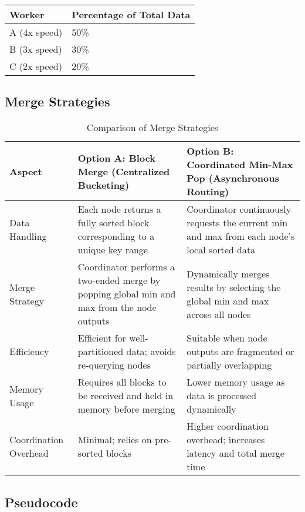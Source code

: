 \documentclass[]{interact}
\theoremstyle{plain}
\theoremstyle{definition}
\theoremstyle{remark}
\begin{document}
\begin{center}
\footnotesize
\renewcommand{\arraystretch}{1.5} %
\begin{tabular}{|p{6.7cm}|p{6.7cm}|}
\hline
\textbf{Worker} & \textbf{Percentage of Total Data} \\
\hline
A (4x speed) & 50\% \\
\hline
B (3x speed) & 30\% \\
\hline
C (2x speed) & 20\% \\
\hline
\end{tabular}
\end{center}

\subsection{Merge Strategies}

\begin{table}[H]
\centering
\renewcommand{\arraystretch}{1.5} %
\footnotesize
\begin{tabular}{|p{3cm}|p{5cm}|p{5cm}|}
\hline
\textbf{Aspect} & \textbf{Option A: Block Merge (Centralized Bucketing)} & \textbf{Option B: Coordinated Min-Max Pop (Asynchronous Routing)} \\ \hline
Data Handling & Each node returns a fully sorted block corresponding to a unique key range & Coordinator continuously requests the current min and max from each node's local sorted data \\ \hline
Merge Strategy & Coordinator performs a two-ended merge by popping global min and max from the node outputs & Dynamically merges results by selecting the global min and max across all nodes \\ \hline
Efficiency & Efficient for well-partitioned data; avoids re-querying nodes & Suitable when node outputs are fragmented or partially overlapping \\ \hline
Memory Usage & Requires all blocks to be received and held in memory before merging & Lower memory usage as data is processed dynamically \\ \hline
Coordination Overhead & Minimal; relies on pre-sorted blocks & Higher coordination overhead; increases latency and total merge time \\ \hline
\end{tabular}
\caption{Comparison of Merge Strategies}
\end{table}


\subsection{Pseudocode}
\end{document}
